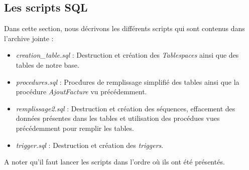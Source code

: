 \subsection{Les scripts \textbf{SQL}}
Dans cette section, nous décrivons les diff\'erents scripts qui sont contenus dans l'archive jointe : 
\begin{itemize}
\item \textit{creation\_table.sql} : Destruction et cr\'eation des \textit{Tablespaces} ainsi que des tables de notre base. 
\item \textit{procedures.sql} : Proc\'dures de remplissage simplifi\'e des tables ainsi que la proc\'edure \textit{AjoutFacture} vu pr\'ec\'edemment.
\item \textit{remplissage2.sql} : Destruction et cr\'eation des s\'equences, effacement des donn\'ees pr\'esentes dans les tables et utilisation des proc\'edues vues pr\'ec\'edemment pour remplir les tables.
\item \textit{trigger.sql} : Destruction et cr\'eation des \textit{triggers}.
\end{itemize}

A noter qu'il faut lancer les scripts dans l'ordre o\`u ils ont \'et\'e pr\'esent\'es.
\newpage